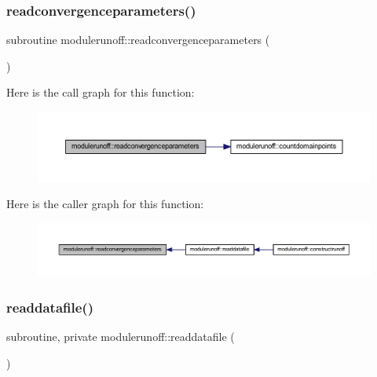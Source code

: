 \subsubsection{\texorpdfstring{readconvergenceparameters()}{readconvergenceparameters()}}
{\footnotesize\ttfamily subroutine modulerunoff\+::readconvergenceparameters (\begin{DoxyParamCaption}{ }\end{DoxyParamCaption})\hspace{0.3cm}{\ttfamily [private]}}

Here is the call graph for this function\+:\nopagebreak
\begin{figure}[H]
\begin{center}
\leavevmode
\includegraphics[width=350pt]{namespacemodulerunoff_a82e45fea3cfee6af75a962d5a7d2224b_cgraph}
\end{center}
\end{figure}
Here is the caller graph for this function\+:\nopagebreak
\begin{figure}[H]
\begin{center}
\leavevmode
\includegraphics[width=350pt]{namespacemodulerunoff_a82e45fea3cfee6af75a962d5a7d2224b_icgraph}
\end{center}
\end{figure}
\mbox{\label{namespacemodulerunoff_aa5edc73e0e11d57e48fd2c2b7dd60845}} 
\subsubsection{\texorpdfstring{readdatafile()}{readdatafile()}}
{\footnotesize\ttfamily subroutine, private modulerunoff\+::readdatafile (\begin{DoxyParamCaption}{ }\end{DoxyParamCaption})\hspace{0.3cm}{\ttfamily [private]}}

